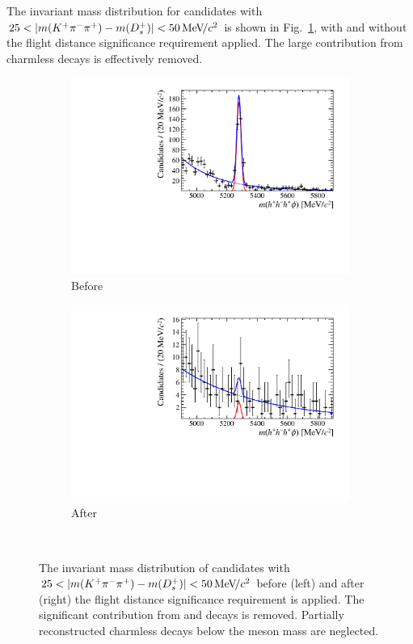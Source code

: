 The invariant mass distribution for \decay{\Bp}{(\decay{\Dsp}{\Kp\pim\pip})\phiz} candidates with $25 < |m({{K}^+}{{\pi}^-}{{\pi}^+}) - m({{D}^+_{s}})| < 50{\mathrm{\,Me\kern -0.1em V\!/}c^2}$ is shown in Fig.~\ref{fig:Selection_charmless_before_after}, with and without the flight distance significance requirement applied. The large contribution from charmless decays is effectively removed.
\begin{figure}[!h]
    \centering
    \begin{subfigure}[t]{0.4\textwidth}
        \includegraphics[width=1.0\textwidth]{figs/Selection/Signal_Ds2KPiPi_Test2_0_000000_DslessFDCHI2.pdf}
        \caption{Before}
    \end{subfigure}%
    \begin{subfigure}[t]{0.4\textwidth}
        \includegraphics[width=1.0\textwidth]{figs/Selection/Signal_Ds2KPiPi_Test2_25_000000_DslessFDCHI2.pdf}
        \caption{After}
    \end{subfigure}\\
    \caption{The invariant mass distribution of \decay{\Bp}{(\decay{\Dsp}{\Kp\pim\pip})\phiz} candidates with $25 < |m({{K}^+}{{\pi}^-}{{\pi}^+}) - m({{D}^+_{s}})| < 50{\mathrm{\,Me\kern -0.1em V\!/}c^2} $ before (left) and after (right) the flight distance significance requirement is applied. The significant contribution from \decay{\Bp}{\Kp\pim\pip\phiz} and \decay{\Bp}{\Kp\pim\pip\Kp\Km} decays is removed. Partially reconstructed charmless decays below the \Bp meson mass are neglected.}
    \label{fig:Selection_charmless_before_after}   
\end{figure}
